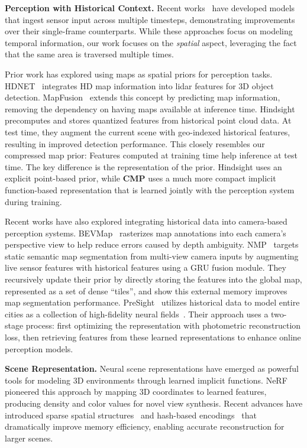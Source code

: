 \documentclass{article} %
\newcommand{\myparagraph}[1]{\vspace{0.2em}\noindent\textbf{#1}}
\newcommand{\nameunder}{compressed\xspace}
\newcommand{\ours}{CMP\xspace}
\newcommand{\oursbold}{\textbf{\ours}\xspace}
\begin{document}
\myparagraph{Perception with Historical Context.}
Recent works~\cite{saha2021enabling,wang2023exploring,yang2022bevformer,huang2022bevpoolv2} have developed models that ingest sensor input across multiple timesteps, demonstrating improvements over their single-frame counterparts.
While these approaches focus on modeling temporal information, our work focuses on the \textit{spatial} aspect, leveraging the fact that the same area is traversed multiple times.

Prior work has explored using maps as spatial priors for perception tasks.
HDNET~\cite{yang2018hdnet} integrates HD map information into lidar features for 3D object detection.
MapFusion~\cite{fang2021mapfusion} extends this concept by predicting map information, removing the dependency on having maps available at inference time.
Hindsight~\cite{you2022hindsight} precomputes and stores quantized features from historical point cloud data.
At test time, they augment the current scene with geo-indexed historical features, resulting in improved detection performance.
This closely resembles our \nameunder map prior: Features computed at training time help inference at test time.
The key difference is the representation of the prior.
Hindsight uses an explicit point-based prior, while \oursbold uses a much more compact implicit function-based representation that is learned jointly with the perception system during training.

Recent works have also explored integrating historical data into camera-based perception systems.
BEVMap~\cite{chang2024bevmap} rasterizes map annotations into each camera's perspective view to help reduce errors caused by depth ambiguity.
NMP~\cite{xiong2023neural} targets static semantic map segmentation from multi-view camera inputs by augmenting live sensor features with historical features using a GRU fusion module.
They recursively update their prior by directly storing the features into the global map, represented as a set of dense ``tiles'', and show this external memory improves map segmentation performance.
PreSight~\cite{yuan2024presight} utilizes historical data to model entire cities as a collection of high-fidelity neural fields~\cite{muller2022instant,yang2023emernerf}.
Their approach uses a two-stage process: first optimizing the representation with photometric reconstruction loss, then retrieving features from these learned representations to enhance online perception models.

\myparagraph{Scene Representation.}
Neural scene representations have emerged as powerful tools for modeling 3D environments through learned implicit functions.
NeRF~\cite{mildenhall2021nerf} pioneered this approach by mapping 3D coordinates to learned features, producing density and color values for novel view synthesis.
Recent advances have introduced sparse spatial structures~\cite{yu2021plenoxels} and hash-based encodings~\cite{muller2022instant, shin2023binary} that dramatically improve memory efficiency, enabling accurate reconstruction for larger scenes.
\end{document}
